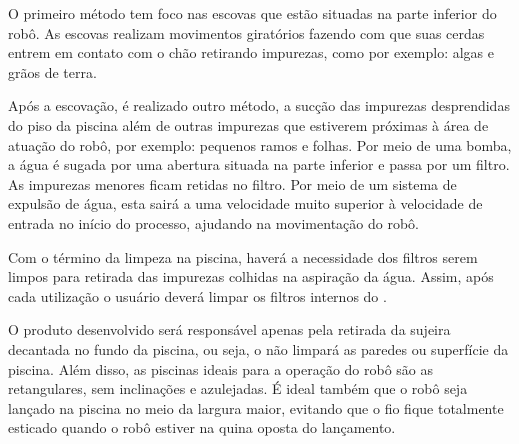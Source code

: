 O primeiro método tem foco nas escovas que estão situadas na parte inferior do robô. As escovas realizam movimentos giratórios fazendo com que suas cerdas entrem em contato com o chão retirando  impurezas, como por exemplo: algas e grãos de terra.

Após a escovação, é realizado outro método, a sucção das impurezas desprendidas do piso da piscina  além de outras impurezas que estiverem próximas à área de atuação do robô, por exemplo: pequenos ramos e folhas. Por meio de uma bomba, a água é sugada por uma abertura situada na parte inferior e passa por um filtro. As impurezas menores ficam retidas no filtro. Por meio de um sistema de expulsão de água, esta sairá a uma velocidade muito superior à velocidade de entrada no início do processo, ajudando na movimentação do robô.

Com o término da limpeza na piscina, haverá a necessidade dos filtros serem limpos para retirada das impurezas colhidas na aspiração da água. Assim, após cada utilização o usuário deverá limpar os filtros internos do \cpr.

O produto desenvolvido será responsável apenas pela retirada da sujeira decantada no fundo da piscina, ou seja, o \cpr não limpará as paredes ou superfície da piscina. Além disso, as piscinas ideais para a operação do robô são as retangulares, sem inclinações e azulejadas. É ideal também que o robô seja lançado na piscina no meio da largura maior, evitando que o fio fique totalmente esticado quando o robô estiver na quina oposta do lançamento.  

